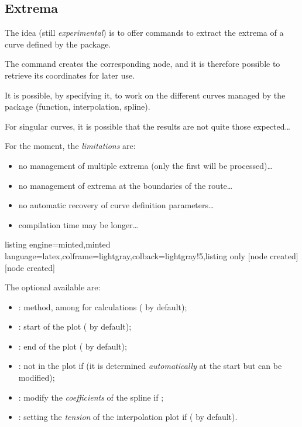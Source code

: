 \documentclass[11pt,a4paper]{ltxdoc}
\begin{document}
\pagebreak

\subsection{Extrema}\label{maximum}\label{minimum}

The idea (still \textit{experimental}) is to offer commands to extract the extrema of a curve defined by the package.

The command creates the corresponding node, and it is therefore possible to retrieve its coordinates for later use.

\smallskip

It is possible, by specifying it, to work on the different curves managed by the package (function, interpolation, spline).

For singular curves, it is possible that the results are not quite those expected\ldots

\smallskip

{\small\faBomb} For the moment, the \textit{limitations} are:

\begin{itemize}
	\item no management of multiple extrema (only the first will be processed)\ldots
	\item no management of extrema at the boundaries of the route\ldots
	\item no automatic recovery of curve definition parameters\ldots
	\item compilation time may be longer\ldots
\end{itemize}

\begin{tcblisting}{listing engine=minted,minted language=latex,colframe=lightgray,colback=lightgray!5,listing only}
[node created]
[node created]
\end{tcblisting}

The optional \MontreCode{[keys]} available are:

\smallskip

\begin{itemize}
	\item {}: method, among  for calculations ( by default);
	\item {}: start of the plot ( by default);
	\item {}: end of the plot ( by default);
	\item {}: not in the plot if  (it is determined \textit{automatically} at the start but can be modified);
	\item {}: modify the \textit{coefficients} of the spline if ;
	\item {}: setting the \textit{tension} of the interpolation plot if ( by default).
\end{itemize}
\end{document}
